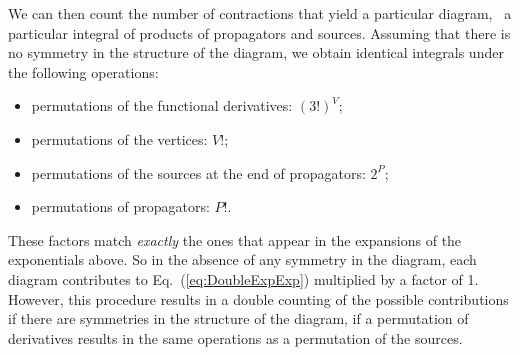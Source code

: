 We can then count the number of contractions that yield a particular diagram,
\ie\ a particular integral of products of propagators and sources. Assuming that
there is no symmetry in the structure of the diagram, we obtain identical
integrals under the following operations: 
\begin{itemize}
\item permutations of the functional derivatives: $(3!)^V$;
\item permutations of the vertices: $V!$;
\item permutations of the sources at the end of propagators: $2^P$;
\item permutations of propagators: $P!$.
\end{itemize}
These factors match {\em exactly} the ones that appear in the
expansions of the exponentials above. So in the absence of any
symmetry in the diagram, each diagram contributes to
Eq.~(\ref{eq:DoubleExpExp}) multiplied by a factor of 1. However, this
procedure results in a double counting of the possible contributions
if there are symmetries in the structure of the diagram, \ie if a
permutation of derivatives results in the same operations as a
permutation of the sources. 

\bigskip

